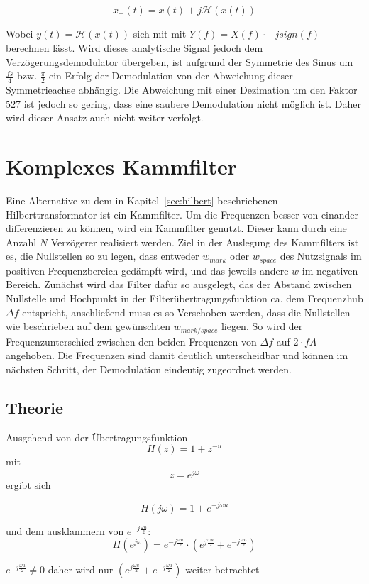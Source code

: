 \documentclass{article}
\begin{document}
$$ 
x_+(t) = x(t) + j \mathcal{H}(x(t))
$$

Wobei $y(t) = \mathcal{H}(x(t))$ sich mit mit $Y(f) = X(f) \cdot -j sign(f)$ berechnen lässt.
Wird dieses analytische Signal jedoch dem Verzögerungsdemodulator übergeben, ist aufgrund der Symmetrie des Sinus um $\frac{fs}{4}$ bzw. $\frac{\pi}{2}$ ein Erfolg der Demodulation von der Abweichung dieser Symmetrieachse abhängig. Die Abweichung mit einer Dezimation um den Faktor 527 ist jedoch so gering, dass eine saubere Demodulation nicht möglich ist. Daher wird
dieser Ansatz auch nicht weiter verfolgt.

\section{Komplexes Kammfilter}\label{sec:comb}
Eine Alternative zu dem in Kapitel~\ref{sec:hilbert} beschriebenen Hilberttransformator ist ein Kammfilter.
Um die Frequenzen besser von einander differenzieren zu können, wird ein Kammfilter genutzt. Dieser kann durch eine Anzahl $N$ Verzögerer realisiert werden.
Ziel in der Auslegung des Kammfilters ist es, die Nullstellen so zu legen, dass entweder $w_{mark}$ oder $w_{space}$ des Nutzsignals im positiven Frequenzbereich
gedämpft wird, und das jeweils andere $w$ im negativen Bereich. Zunächst wird das Filter dafür so ausgelegt, das der Abstand zwischen
Nullstelle und Hochpunkt in der Filterübertragungsfunktion ca. dem Frequenzhub $\varDelta f$ entspricht, anschließend muss es so Verschoben werden, dass die Nullstellen wie beschrieben auf dem
gewünschten $w_{mark/space}$ liegen.
So wird der Frequenzunterschied zwischen den beiden Frequenzen von $\varDelta f$ auf $2\cdot fA$ angehoben.
Die Frequenzen sind damit deutlich unterscheidbar und können im nächsten Schritt, der Demodulation eindeutig zugeordnet werden. 

\subsection{Theorie}


Ausgehend von der Übertragungsfunktion 
$$H(z) = 1 + z^{-u}$$ 
mit 
$$ z = e^{j\omega} $$
ergibt sich

$$H(j\omega) = 1 + e^{-j\omega u}$$

und dem ausklammern von $ e^{-j \frac{\omega u}{2}}$:
$$
H(e^{j\omega}) = e^{-j \frac{\omega u}{2}} \cdot (e^{j \frac{\omega u}{2}} + e^{-j \frac{\omega u}{2}})
$$

$e^{-j \frac{\omega u}{2}} \neq 0$ daher wird nur $(e^{j \frac{\omega u}{2}} + e^{-j \frac{\omega u}{2}})$ weiter betrachtet
\end{document}
